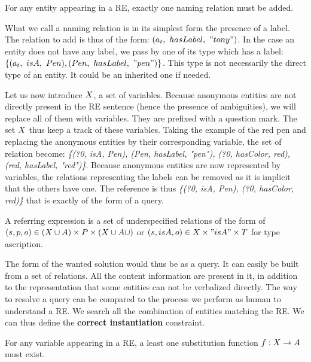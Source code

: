 \begin{theorem} 
\label{the:parlance_need}
For any entity appearing in a RE, exactly one naming relation must be added.
\end{theorem}

What we call a naming relation is in its simplest form the presence of a label. The relation to add is thus of the form: $(a_t,\ hasLabel,\ "tony")$. In the case an entity does not have any label, we pass by one of its type which has a label: $\{(\indiv_t,\ isA,\ Pen), (Pen,\ hasLabel,\ "pen")\}$. This type is not necessarily the direct type of an entity. It could be an inherited one if needed.

Let us now introduce $X$, a set of variables. Because anonymous entities are not directly present in the RE sentence (hence the presence of ambiguities), we will replace all of them with variables. They are prefixed with a question mark. The set $X$ thus keep a track of these variables. Taking the example of the red pen and replacing the anonymous entities by their corresponding variable, the set of relation become: \textit{\{(?0, isA, Pen), (Pen, hasLabel, "pen"), (?0, hasColor, red), (red,  hasLabel, "red")\}}. Because anonymous entities are now represented by variables, the relations representing the labels can be removed as it is implicit that the others have one. The reference is thus \textit{\{(?0, isA, Pen), (?0, hasColor, red)\}} that is exactly of the form of a \sparql{} query.

\begin{definition}
A referring expression is a set of underspecified relations of the form of $(s, p, o) \in (X \cup A) \times P \times (X \cup A \cup)$ or $(s, isA, o) \in X \times "isA" \times T$ for type ascription.
\end{definition}

The form of the wanted solution would thus be as a \sparql{} query. It can easily be built from a set of relations. All the content information are present in it, in addition to the representation that some entities can not be verbalized directly. The way to resolve a \sparql{} query can be compared to the process we perform as human to understand a RE. We search all the combination of entities matching the RE. We can thus define the \textbf{correct instantiation} constraint.

\begin{theorem} 
\label{the:correct_intance}
For any variable appearing in a RE, a least one substitution function $f: X \rightarrow A$ must exist.
\end{theorem}


